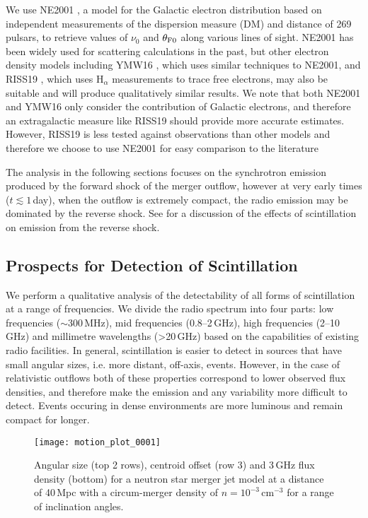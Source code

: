 We use NE2001 \citep{2002astro.ph..7156C,2003astro.ph..1598C}, a model for the Galactic electron distribution based on independent measurements of the dispersion measure (DM) and distance of 269 pulsars, to retrieve values of $\nu_0$ and $\theta_{\rm F0}$ along various lines of sight. NE2001 has been widely used for scattering calculations in the past, but other electron density models including YMW16 \citep{2017ApJ...835...29Y}, which uses similar techniques to NE2001, and RISS19 \citep{2019arXiv190708395H}, which uses H$_\alpha$ measurements to trace free electrons, may also be suitable and will produce qualitatively similar results. We note that both NE2001 and YMW16 only consider the contribution of Galactic electrons, and therefore an extragalactic measure like RISS19 should provide more accurate estimates. However, RISS19 is less tested against observations than other models and therefore we choose to use NE2001 for easy comparison to the literature

The analysis in the following sections focuses on the synchrotron emission produced by the forward shock of the merger outflow, however at very early times ($t\lesssim 1\,$day), when the outflow is extremely compact, the radio emission may be dominated by the reverse shock. See \citet{2019MNRAS.489.1820L} for a discussion of the effects of scintillation on emission from the reverse shock.

\vspace{-5pt}
\subsection{Prospects for Detection of Scintillation}
\vspace{-5pt}
We perform a qualitative analysis of the detectability of all forms of scintillation at a range of frequencies. We divide the radio spectrum into four parts: low frequencies ($\sim$300\,MHz), mid frequencies (0.8--2\,GHz), high frequencies (2--10\,GHz) and millimetre wavelengths (>20\,GHz) based on the capabilities of existing radio facilities. In general, scintillation is easier to detect in sources that have small angular sizes, i.e. more distant, off-axis, events. However, in the case of relativistic outflows both of these properties correspond to lower observed flux densities, and therefore make the emission and any variability more difficult to detect. Events occuring in dense environments are more luminous and remain compact for longer.

\begin{figure}
\centering
\texttt{[image: motion\_plot\_0001]}
\caption[Evolution of the angular size, centroid offset and flux density from a relativisitc jet]{Angular size (top 2 rows), centroid offset (row 3) and 3\,GHz flux density (bottom) for a neutron star merger jet model at a distance of 40\,Mpc with a circum-merger density of $n=10^{-3}\,$cm$^{-3}$ for a range of inclination angles.}
\label{fig:motion+flux}
\end{figure}

